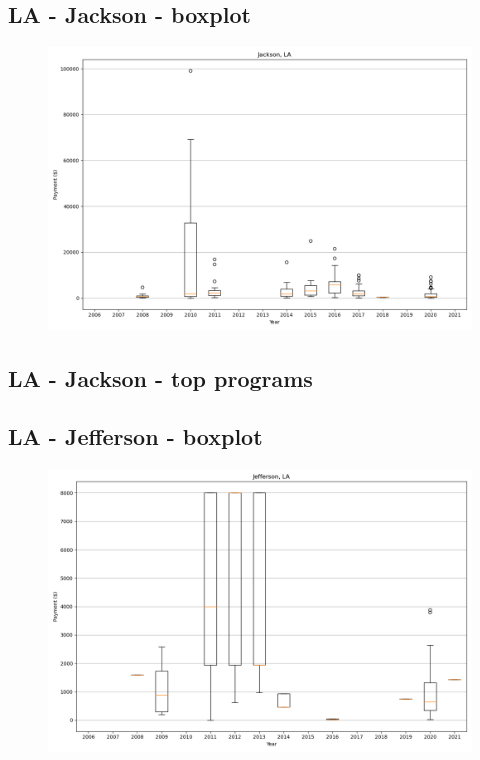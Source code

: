 \subsection*{LA - Jackson - boxplot}
\begin{figure}[h]
\centering
\includegraphics[width=7in]{../output/boxplots/counties/Jackson-LA_boxplot.png}
\end{figure}


\subsection*{LA - Jackson - top programs}

\newpage
\subsection*{LA - Jefferson - boxplot}
\begin{figure}[h]
\centering
\includegraphics[width=7in]{../output/boxplots/counties/Jefferson-LA_boxplot.png}
\end{figure}


